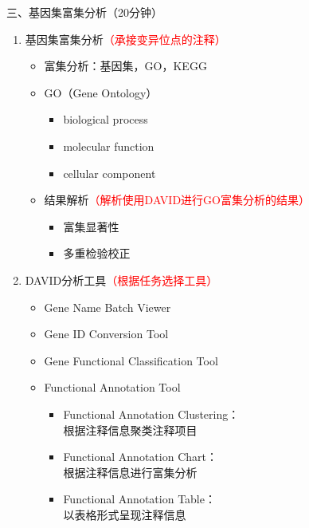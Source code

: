 \documentclass{TIJMUjiaoanLL}
\begin{document}
\vspace*{0.2cm}
\noindent
三、基因集富集分析（20分钟）
\begin{enumerate}
  \item 基因集富集分析\textcolor{red}{（承接变异位点的注释）}
    \begin{itemize}
      \item 富集分析：基因集，GO，KEGG
      \item GO（Gene Ontology）
      \begin{itemize}
        \item biological process
        \item molecular function
        \item cellular component
      \end{itemize}
      \item 结果解析\textcolor{red}{（解析使用DAVID进行GO富集分析的结果）}
      \begin{itemize}
        \item 富集显著性
        \item 多重检验校正
      \end{itemize}
    \end{itemize}

\otherTail
\newpage
\otherHeader

  \item DAVID分析工具\textcolor{red}{（根据任务选择工具）}
    \begin{itemize}
      \item Gene Name Batch Viewer
      \item Gene ID Conversion Tool
      \item Gene Functional Classification Tool
      \item Functional Annotation Tool
      \begin{itemize}
        \item Functional Annotation Clustering：\\ 根据注释信息聚类注释项目
        \item Functional Annotation Chart：\\ 根据注释信息进行富集分析
        \item Functional Annotation Table：\\ 以表格形式呈现注释信息
      \end{itemize}
    \end{itemize}
\end{enumerate}
\end{document}
